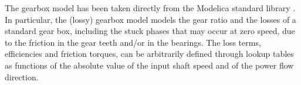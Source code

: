 \documentclass[]{interact}
\theoremstyle{plain}%
\theoremstyle{definition}
\theoremstyle{remark}
\begin{document}
{The gearbox model has been taken directly from the Modelica standard library \cite{PSO20002}. In particular, the (lossy) gearbox model models the gear ratio and the losses of a standard gear box, including the stuck phases that may occur at zero speed, due to the friction in the gear teeth and/or in the bearings. The loss terms, efficiencies and friction torques, can be arbitrarily defined through lookup tables as functions of the absolute value of the input shaft speed and of the power flow direction.

\begin{figure}
\centering
{}\hspace{1cm}

\end{figure}}
\end{document}
